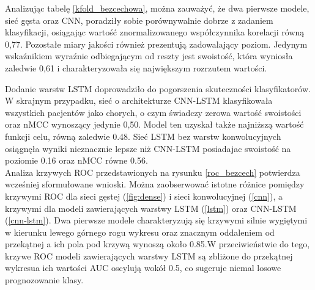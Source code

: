 \documentclass[a4paper,twoside,12pt]{book}
\begin{document}
Analizując tabelę \ref{kfold_bezcechowa}, można zauważyć, że dwa pierwsze modele, sieć gęsta oraz CNN, poradziły sobie porównywalnie dobrze z zadaniem klasyfikacji, osiągając wartość znormalizowanego współczynnika korelacji równą 0,77. Pozostałe miary jakości również prezentują zadowalający poziom. Jedynym wskaźnikiem wyraźnie odbiegającym od reszty jest swoistość, która wyniosła zaledwie 0,61 i charakteryzowała się największym rozrzutem wartości.

Dodanie warstw LSTM doprowadziło do pogorszenia skuteczności klasyfikatorów. W skrajnym przypadku, sieć o architekturze CNN-LSTM klasyfikowała wszystkich pacjentów jako chorych, o czym świadczy zerowa wartość swoistości oraz nMCC wynoszący jedynie 0,50. Model ten uzyskał także najniższą wartość funkcji celu, równą zaledwie 0.48. Sieć LSTM bez warstw konwolucyjnych osiągnęła wyniki nieznacznie lepsze niż CNN-LSTM posiadajac swoistość na poziomie 0.16 oraz nMCC równe 0.56.\\

Analiza krzywych ROC przedstawionych na rysunku \ref{roc_bezcech} potwierdza wcześniej sformułowane wnioski. Można zaobserwować istotne różnice pomiędzy krzywymi ROC dla sieci gęstej (\ref{fig:dense}) i sieci konwolucyjnej (\ref{cnn}), a krzywymi dla modeli zawierających warstwy LSTM (\ref{lstm}) oraz CNN-LSTM (\ref{cnn-lstm}). Dwa pierwsze modele charakteryzują się krzywymi silnie wygiętymi w kierunku lewego górnego rogu wykresu oraz znacznym oddaleniem od przekątnej a ich pola pod krzywą wynoszą około 0.85.W przeciwieństwie do tego, krzywe ROC modeli zawierających warstwy LSTM są zbliżone do przekątnej wykresua ich wartości AUC oscylują wokół 0.5, co sugeruje niemal losowe prognozowanie klasy.
\end{document}
